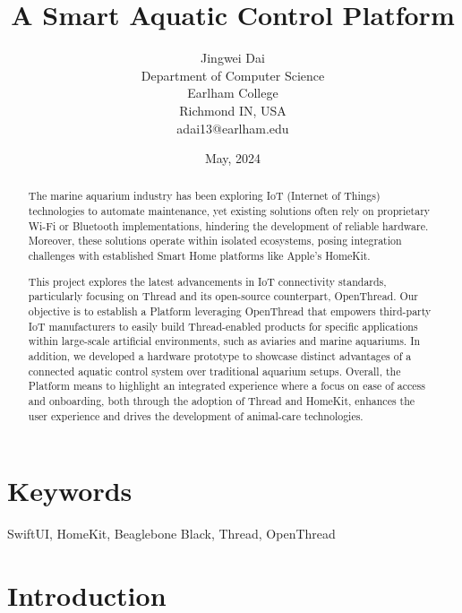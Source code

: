 \documentclass[8pt,twocolumn]{article}
\title{A Smart Aquatic Control Platform}
\author{Jingwei Dai\\Department of Computer Science\\Earlham College\\Richmond IN, USA\\adai13@earlham.edu\\}
\date{May, 2024}
\begin{document}
\maketitle

\begin{abstract}
The marine aquarium industry has been exploring IoT (Internet of Things) technologies to automate maintenance, yet existing solutions often rely on proprietary Wi-Fi or Bluetooth implementations, hindering the development of reliable hardware. Moreover, these solutions operate within isolated ecosystems, posing integration challenges with established Smart Home platforms like Apple’s HomeKit.

This project explores the latest advancements in IoT connectivity standards, particularly focusing on Thread and its open-source counterpart, OpenThread. Our objective is to establish a Platform leveraging OpenThread that empowers third-party IoT manufacturers to easily build Thread-enabled products for specific applications within large-scale artificial environments, such as aviaries and marine aquariums. In addition, we developed a hardware prototype to showcase distinct advantages of a connected aquatic control system over traditional aquarium setups. Overall, the Platform means to highlight an integrated experience where a focus on ease of access and onboarding, both through the adoption of Thread and HomeKit, enhances the user experience and drives the development of animal-care technologies.
\end{abstract}

\section*{Keywords}

SwiftUI, HomeKit, Beaglebone Black, Thread, OpenThread

\section{Introduction}
\end{document}
